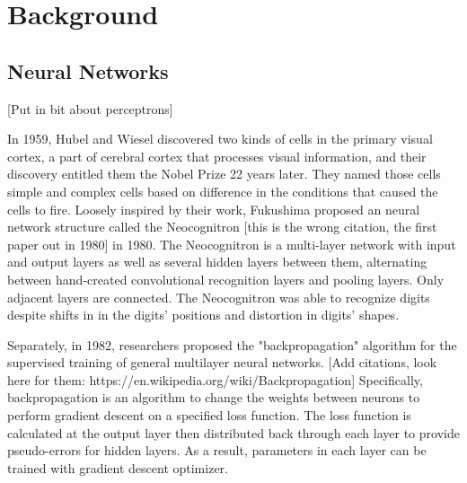 \chapter{Background} %

\label{Chapter 2} %


\newcommand{\keyword}[1]{\textbf{#1}}
\newcommand{\tabhead}[1]{\textbf{#1}}
\newcommand{\code}[1]{\texttt{#1}}
\newcommand{\file}[1]{\texttt{\bfseries#1}}
\newcommand{\option}[1]{\texttt{\itshape#1}}

\section{Neural Networks}

[Put in bit about perceptrons]

In 1959, Hubel and Wiesel discovered two kinds of cells in the primary visual cortex, a part of cerebral cortex that processes visual information, and their discovery entitled them the Nobel Prize 22 years later. They named those cells simple and complex cells based on difference in the conditions that caused the cells to fire. Loosely inspired by their work, Fukushima proposed an  neural network structure called the Neocognitron \cite{fukushima_neocognitron:_1982} [this is the wrong citation, the first paper out in 1980] in 1980. The Neocognitron is a multi-layer network with input and output layers as well as several hidden layers between them, alternating between hand-created convolutional recognition layers and pooling layers. Only adjacent layers are connected. The Neocognitron was able to recognize digits despite shifts in in the digits' positions and distortion in digits' shapes. 

Separately, in 1982, researchers proposed the "backpropagation" algorithm for the supervised training of general multilayer neural networks. [Add citations, look here for them: https://en.wikipedia.org/wiki/Backpropagation]   Specifically, backpropagation is an algorithm to change the weights between neurons to perform gradient descent on a specified loss function.  The loss function is calculated at the output layer then distributed back through each layer to provide pseudo-errors for hidden layers. As a result, parameters in each layer can be trained with gradient descent optimizer.

